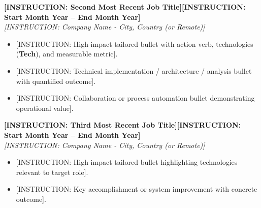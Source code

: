 \documentclass[10pt,a4paper]{article}
\newcommand{\jobentry}[1]{%
  \vspace{2pt}%
  \noindent%
  \begin{minipage}[t]{3.5cm}%
    \hspace{1pt}%
  \end{minipage}%
  \hspace{0.3cm}%
  \begin{minipage}[t]{\dimexpr\textwidth-3.8cm\relax}%
    \small \color{textdark} #1%
  \end{minipage}%
  \par \vspace{3pt}%
}
\begin{document}
\jobentry{%
  \textbf{[INSTRUCTION: Second Most Recent Job Title]}\hfill \textbf{[INSTRUCTION: Start Month Year -- End Month Year]}\\
  \emph{[INSTRUCTION: Company Name - City, Country (or Remote)]}
  \begin{itemize}
    \item {[INSTRUCTION: High-impact tailored bullet with action verb, technologies (\textbf{Tech}), and measurable metric].}
    \item {[INSTRUCTION: Technical implementation / architecture / analysis bullet with quantified outcome].}
    \item {[INSTRUCTION: Collaboration or process automation bullet demonstrating operational value].}
  \end{itemize}
}

\jobentry{%
  \textbf{[INSTRUCTION: Third Most Recent Job Title]}\hfill \textbf{[INSTRUCTION: Start Month Year -- End Month Year]}\\
  \emph{[INSTRUCTION: Company Name - City, Country (or Remote)]}
  \begin{itemize}
    \item {[INSTRUCTION: High-impact tailored bullet highlighting technologies relevant to target role].}
    \item {[INSTRUCTION: Key accomplishment or system improvement with concrete outcome].}
  \end{itemize}
}

\end{document}
